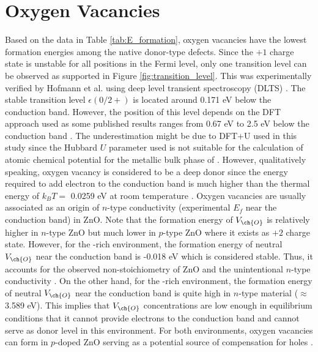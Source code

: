 \clearpage

\section{Oxygen Vacancies}
Based on the data in Table \ref{tab:E_formation}, oxygen vacancies have the lowest formation energies among the native donor-type defects. Since the $+1$ charge state is unstable for all positions in the Fermi level, only one transition level can be observed as supported in Figure \ref{fig:transition_level}. This was experimentally verified by Hofmann et al. using deep level transient spectroscopy (DLTS) \citep{Hofmann2007}.
The stable transition level $\epsilon(0/2+)$ is located around 0.171 eV below the conduction band. However, the position of this level depends on the DFT approach used as some published results ranges from 0.67 eV to 2.5 eV below the conduction band \citep{Lany2010, Oba2008, Paudel2008}. The underestimation might be due to DFT+U used in this study since the Hubbard $U$ parameter used is not suitable for the calculation of atomic chemical potential for the metallic bulk phase of  \citep{Lany2010}. However, qualitatively speaking, oxygen vacancy is considered to be a deep donor since the energy required to add electron to the conduction band is much higher than the thermal energy of $k_B T = $ 0.0259 eV at room temperature \citep{Freysoldt2014}. Oxygen vacancies are usually associated as an origin of $n$-type conductivity (experimental $E_f$ near the conduction band) in ZnO. Note that the formation energy of $V_{\ch{O}}$ is relatively higher in  $n$-type ZnO  but much lower in $p$-type ZnO where it exists as $+2$ charge state. However, for the -rich environment, the formation energy of neutral $V_{\ch{O}}$  near the conduction band is -0.018 eV which is considered stable. Thus, it accounts for the observed non-stoichiometry of ZnO and the unintentional $n$-type conductivity \citep{Oba2011}. On the other hand, for the -rich environment, the formation energy of neutral $V_{\ch{O}}$  near the conduction band is quite high in $n$-type material ($\approx$ 3.589 eV). This implies that  $V_{\ch{O}}$ concentrations are low enough in equilibrium conditions that it cannot provide electrons to the conduction band and cannot serve as donor level in this environment. For both environments, oxygen vacancies can form in $p$-doped ZnO serving as a potential source of compensation for holes \citep{Janotti2007}. 


